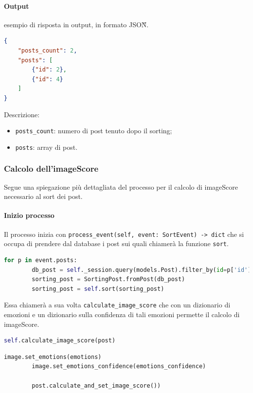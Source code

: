 \paragraph*{Output} esempio di risposta in output, in formato JSON\G{}.
\begin{lstlisting}[language=JSON]
{
    "posts_count": 2,
    "posts": [
        {"id": 2},
        {"id": 4}
    ]
}
\end{lstlisting}
Descrizione:
\begin{itemize}
    \item \verb|posts_count|: numero di post tenuto dopo il sorting;
    \item \verb|posts|: array di post. 
\end{itemize}

\subsubsection{Calcolo dell'imageScore}
Segue una spiegazione più dettagliata del processo per il calcolo di imageScore necessario al sort dei post.
\paragraph{Inizio processo} \aCapo{}
Il processo inizia con \verb+process_event(self, event: SortEvent) -> dict+ che si occupa di prendere dal database i post sui quali chiamerà la funzione \verb+sort+.
\begin{lstlisting}[language=Python]
        for p in event.posts:
        db_post = self._session.query(models.Post).filter_by(id=p['id']).first()
        sorting_post = SortingPost.fromPost(db_post)
        sorting_post = self.sort(sorting_post)
\end{lstlisting} 
Essa chiamerà a sua volta \verb+calculate_image_score+ che con un dizionario di emozioni e un dizionario sulla confidenza di tali emozioni permette il calcolo di imageScore.
\begin{lstlisting}[language=Python]
        self.calculate_image_score(post)
\end{lstlisting}
\begin{lstlisting}[language=Python]
        image.set_emotions(emotions)
        image.set_emotions_confidence(emotions_confidence)

        post.calculate_and_set_image_score())
\end{lstlisting} 
